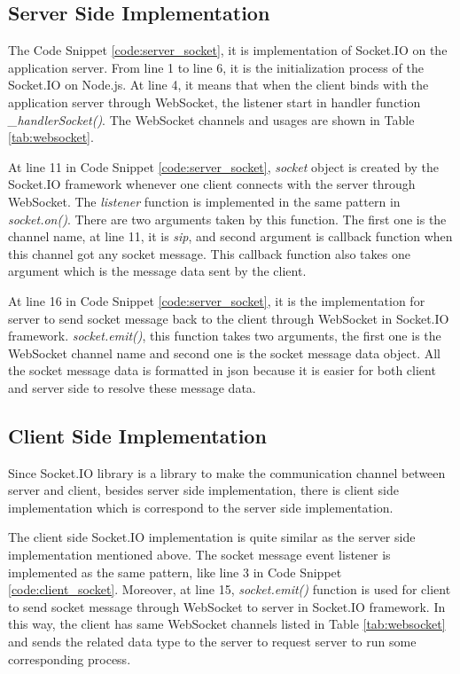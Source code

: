 \subsection{Server Side Implementation}

\par The Code Snippet \ref{code:server_socket}, it is implementation of Socket.IO on the application server. From line 1 to line 6, it is the initialization process of the Socket.IO on Node.js. At line 4, it means that when the client binds with the application server through WebSocket, the listener start in handler function \textit{\_handlerSocket()}. The WebSocket channels and usages are shown in Table \ref{tab:websocket}.

\par At line 11 in Code Snippet \ref{code:server_socket}, \textit{socket} object is created by the Socket.IO framework whenever one client connects with the server through WebSocket. The \textit{listener} function is implemented in the same pattern in \textit{socket.on()}. There are two arguments taken by this function. The first one is the channel name, at line 11, it is \textit{sip}, and second argument is callback function when this channel got any socket message. This callback function also takes one argument which is the message data sent by the client.

\par At line 16 in Code Snippet \ref{code:server_socket}, it is the implementation for server to send socket message back to the client through WebSocket in Socket.IO framework. \textit{socket.emit()}, this function takes two arguments, the first one is the WebSocket channel name and second one is the socket message data object. All the socket message data is formatted in \gls{json} because it is easier for both client and server side to resolve these message data.

\subsection{Client Side Implementation}

\par Since Socket.IO library is a library to make the communication channel between server and client, besides server side implementation, there is client side implementation which is correspond to the server side implementation.

\par The client side Socket.IO implementation is quite similar as the server side implementation mentioned above. The socket message event listener is implemented as the same pattern, like line 3 in Code Snippet \ref{code:client_socket}. Moreover, at line 15, \textit{socket.emit()} function is used for client to send socket message through WebSocket to server in Socket.IO framework. In this way, the client has same WebSocket channels listed in Table \ref{tab:websocket} and sends the related data type to the server to request server to run some corresponding process.


